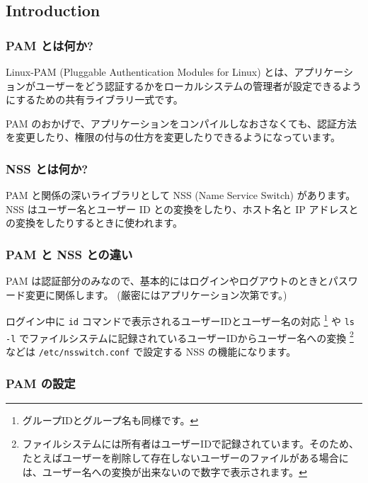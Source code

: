 \documentclass[mingoth,a4paper]{jsarticle}
\begin{document}
\label{linux-pam}
\subsection{Introduction}
\label{sec-1-1}
\subsubsection{PAM とは何か?}
\label{sec-1-1-1}

Linux-PAM (Pluggable Authentication Modules for Linux) とは、アプリケーションがユーザーをどう認証するかをローカルシステムの管理者が設定できるようにするための共有ライブラリ一式です。

PAM のおかげで、アプリケーションをコンパイルしなおさなくても、認証方法を変更したり、権限の付与の仕方を変更したりできるようになっています。
\subsubsection{NSS とは何か?}
\label{sec-1-1-2}

PAM と関係の深いライブラリとして NSS (Name Service Switch) があります。
NSS はユーザー名とユーザー ID との変換をしたり、ホスト名と IP アドレスとの変換をしたりするときに使われます。
\subsubsection{PAM と NSS との違い}
\label{sec-1-1-3}

PAM は認証部分のみなので、基本的にはログインやログアウトのときとパスワード変更に関係します。 (厳密にはアプリケーション次第です。)

ログイン中に \verb~id~ コマンドで表示されるユーザーIDとユーザー名の対応 \footnote{グループIDとグループ名も同様です。 } や \verb~ls -l~ でファイルシステムに記録されているユーザーIDからユーザー名への変換 \footnote{ファイルシステムには所有者はユーザーIDで記録されています。そのため、たとえばユーザーを削除して存在しないユーザーのファイルがある場合には、ユーザー名への変換が出来ないので数字で表示されます。 } などは \verb~/etc/nsswitch.conf~ で設定する NSS の機能になります。
\subsubsection{PAM の設定}
\label{sec-1-1-4}
\end{document}
